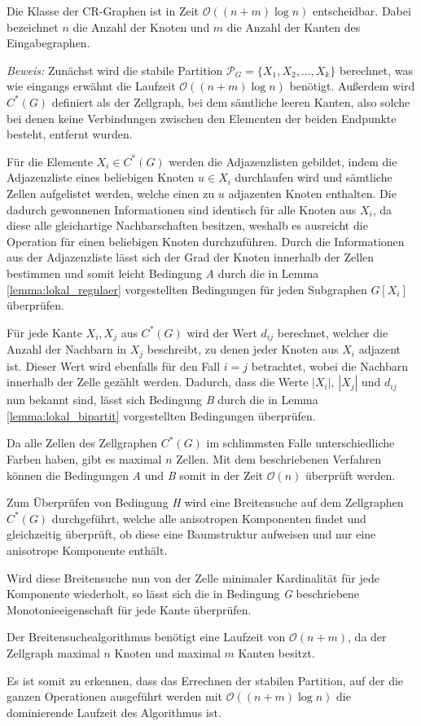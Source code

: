 \begin{Theorem}
	Die Klasse der CR-Graphen ist in Zeit $\mathcal{O}((n+m)\log n)$ entscheidbar. Dabei bezeichnet $n$ die Anzahl der Knoten und $m$ die Anzahl der Kanten des Eingabegraphen.
\end{Theorem}

\emph{Beweis:} Zunächst wird die stabile Partition $\mathcal{P}_G=\{X_1,X_2,...,X_k\}$ berechnet, was wie eingangs erwähnt die Laufzeit $\mathcal{O}((n+m)\log n)$ benötigt.
Außerdem wird $C^*(G)$ definiert als der Zellgraph, bei dem sämtliche leeren Kanten, also solche bei denen keine Verbindungen zwischen den Elementen der beiden Endpunkte besteht, entfernt wurden.

Für die Elemente $X_i\in C^*(G)$ werden die Adjazenzlisten gebildet, indem die Adjazenzliste eines beliebigen Knoten $u\in X_i$ durchlaufen wird und sämtliche Zellen aufgelistet werden, welche einen zu $u$ adjazenten Knoten enthalten.
Die dadurch gewonnenen Informationen sind identisch für alle Knoten aus $X_i$, da diese alle gleichartige Nachbarschaften besitzen, weshalb es ausreicht die Operation für einen beliebigen Knoten durchzuführen.
Durch die Informationen aus der Adjazenzliste lässt sich der Grad der Knoten innerhalb der Zellen bestimmen und somit leicht Bedingung \emph{A} durch die in Lemma \ref{lemma:lokal_regulaer} vorgestellten Bedingungen für jeden Subgraphen $G[X_i]$ überprüfen.

Für jede Kante ${X_i,X_j}$ aus $C^*(G)$ wird der Wert $d_{ij}$ berechnet, welcher die Anzahl der Nachbarn in $X_j$ beschreibt, zu denen jeder Knoten aus $X_i$ adjazent ist.
Dieser Wert wird ebenfalls für den Fall $i=j$ betrachtet, wobei die Nachbarn innerhalb der Zelle gezählt werden.
Dadurch, dass die Werte $|X_i|$, $|X_j|$ und $d_{ij}$ nun bekannt sind, lässt sich Bedingung \emph{B} durch die in Lemma \ref{lemma:lokal_bipartit} vorgestellten Bedingungen überprüfen.

Da alle Zellen des Zellgraphen $C^*(G)$ im schlimmsten Falle unterschiedliche Farben haben, gibt es maximal $n$ Zellen.
Mit dem beschriebenen Verfahren können die Bedingungen \emph{A} und \emph{B} somit in der Zeit $\mathcal{O}(n)$ überprüft werden.

Zum Überprüfen von Bedingung \emph{H} wird eine Breitensuche auf dem Zellgraphen $C^*(G)$ durchgeführt, welche alle anisotropen Komponenten findet und gleichzeitig überprüft, ob diese eine Baumstruktur aufweisen und nur eine anisotrope Komponente enthält.

Wird diese Breitensuche nun von der Zelle minimaler Kardinalität für jede Komponente wiederholt, so lässt sich die in Bedingung \emph{G} beschriebene Monotonieeigenschaft für jede Kante überprüfen.

Der Breitensuchealgorithmus benötigt eine Laufzeit von $\mathcal{O}(n+m)$, da der Zellgraph maximal $n$ Knoten und maximal $m$ Kanten besitzt.

Es ist somit zu erkennen, dass das Errechnen der stabilen Partition, auf der die ganzen Operationen ausgeführt werden mit $\mathcal{O}((n+m)\log n)$ die dominierende Laufzeit des Algorithmus ist.